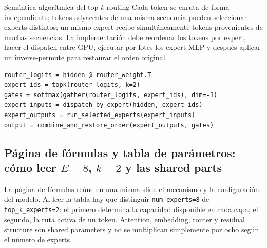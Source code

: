 
\begin{importantbox}{Semántica algorítmica del top-$k$ routing}
Cada token se enruta de forma independiente; tokens adyacentes de una misma secuencia pueden seleccionar experts distintos; un mismo expert recibe simultáneamente tokens provenientes de muchas secuencias. La implementación debe reordenar los tokens por expert, hacer el dispatch entre GPU, ejecutar por lotes los expert MLP y después aplicar un inverse-permute para restaurar el orden original.
\end{importantbox}

\begin{lstlisting}[caption={Pseudocódigo mínimo del top-two token routing}]
router_logits = hidden @ router_weight.T
expert_ids = topk(router_logits, k=2)
gates = softmax(gather(router_logits, expert_ids), dim=-1)
expert_inputs = dispatch_by_expert(hidden, expert_ids)
expert_outputs = run_selected_experts(expert_inputs)
output = combine_and_restore_order(expert_outputs, gates)
\end{lstlisting}


\subsection{Página de fórmulas y tabla de parámetros: cómo leer \texorpdfstring{$E=8$, $k=2$}{E=8, k=2} y las shared parts}

La página de fórmulas reúne en una misma slide el mecanismo y la configuración del modelo. Al leer la tabla hay que distinguir \texttt{num\_experts=8} de \texttt{top\_k\_experts=2}: el primero determina la capacidad disponible en cada capa; el segundo, la ruta activa de un token. Attention, embedding, router y residual structure son shared parameters y no se multiplican simplemente por ocho según el número de experts.


